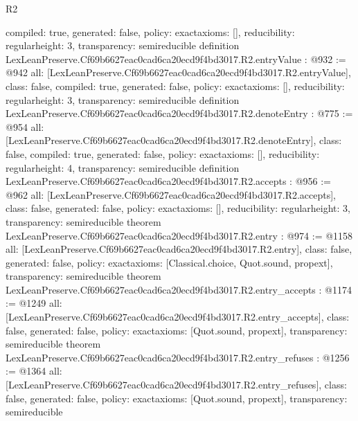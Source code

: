 \begin{lexlean}{R2}
\begin{coremodule}
{  compiled: true,
  generated: false,
  policy: exact{axioms: []},
  reducibility: regular{height: 3},
  transparency: semireducible
}
definition LexLeanPreserve.Cf69b6627eac0cad6ca20ecd9f4bd3017.R2.entryValue : @932 := @942 {
  all: [LexLeanPreserve.Cf69b6627eac0cad6ca20ecd9f4bd3017.R2.entryValue],
  class: false,
  compiled: true,
  generated: false,
  policy: exact{axioms: []},
  reducibility: regular{height: 3},
  transparency: semireducible
}
definition LexLeanPreserve.Cf69b6627eac0cad6ca20ecd9f4bd3017.R2.denoteEntry : @775 := @954 {
  all: [LexLeanPreserve.Cf69b6627eac0cad6ca20ecd9f4bd3017.R2.denoteEntry],
  class: false,
  compiled: true,
  generated: false,
  policy: exact{axioms: []},
  reducibility: regular{height: 4},
  transparency: semireducible
}
definition LexLeanPreserve.Cf69b6627eac0cad6ca20ecd9f4bd3017.R2.accepts : @956 := @962 {
  all: [LexLeanPreserve.Cf69b6627eac0cad6ca20ecd9f4bd3017.R2.accepts],
  class: false,
  generated: false,
  policy: exact{axioms: []},
  reducibility: regular{height: 3},
  transparency: semireducible
}
theorem LexLeanPreserve.Cf69b6627eac0cad6ca20ecd9f4bd3017.R2.entry : @974 := @1158 {
  all: [LexLeanPreserve.Cf69b6627eac0cad6ca20ecd9f4bd3017.R2.entry],
  class: false,
  generated: false,
  policy: exact{axioms: [Classical.choice, Quot.sound, propext]},
  transparency: semireducible
}
theorem LexLeanPreserve.Cf69b6627eac0cad6ca20ecd9f4bd3017.R2.entry_accepts : @1174 := @1249 {
  all: [LexLeanPreserve.Cf69b6627eac0cad6ca20ecd9f4bd3017.R2.entry_accepts],
  class: false,
  generated: false,
  policy: exact{axioms: [Quot.sound, propext]},
  transparency: semireducible
}
theorem LexLeanPreserve.Cf69b6627eac0cad6ca20ecd9f4bd3017.R2.entry_refuses : @1256 := @1364 {
  all: [LexLeanPreserve.Cf69b6627eac0cad6ca20ecd9f4bd3017.R2.entry_refuses],
  class: false,
  generated: false,
  policy: exact{axioms: [Quot.sound, propext]},
  transparency: semireducible
}


\end{coremodule}
\end{lexlean}
